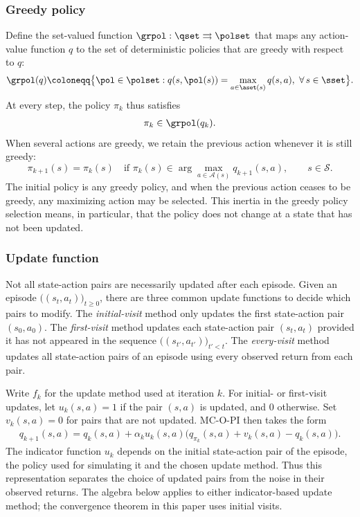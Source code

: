 \subsubsection{Greedy policy}

Define the set-valued function $\grpol : \qset \rightrightarrows \polset$ that maps any action-value function $q$ to the set of deterministic policies that are greedy with respect to $q$:
\begin{align}
\label{eq: greedy pol}
    \grpol(q) \coloneqq \big\{ \pol \in \polset : q(s, \pol(s)) = \max_{a \in \aset(s)} q(s,a), \ \forall \, s \in \sset \big\} .
\end{align}
At every step, the policy $\pi_k$ thus satisfies
\begin{align}
\label{eq: greedy policy def}
    \pi_k \in \grpol(q_k) .
\end{align}
When several actions are greedy, we retain the previous action whenever it is still greedy:
\begin{equation}
\label{eq:greedy-pol-tie-breaking}
\pi_{k+1}(s)=\pi_k(s)
\quad\text{if }\pi_k(s)\in\arg\max_{a\in\mathcal A(s)}q_{k+1}(s,a),
\qquad s\in\mathcal S.
\end{equation}
The initial policy is any greedy policy, and when the previous action ceases to be greedy, any maximizing action may be selected.
This inertia in the greedy policy selection means, in particular, that the policy does not change at a state that has not been updated.

\subsubsection{Update function}

Not all state-action pairs are necessarily updated after each episode.
Given an episode $\big( (s_t, a_t) \big)_{t \ge 0}$, there are three common update functions to decide which pairs to modify.
The \textit{initial-visit} method only updates the first state-action pair $(s_0, a_0)$.
The \textit{first-visit} method updates each state-action pair $(s_t, a_t)$ provided it has not appeared in the sequence $\big((s_{t'}, a_{t'})\big)_{t' < t}$.
The \textit{every-visit} method updates all state-action pairs of an episode using every observed return from each pair.

Write $f_k$ for the update method used at iteration $k$.
For initial- or first-visit updates, let $u_k(s,a)=1$ if the pair $(s,a)$ is updated, and $0$ otherwise. Set $v_k(s,a)=0$ for pairs that are not updated.
MC-O-PI then takes the form
\begin{align}
\label{eq: update q with chi}
q_{k+1}(s,a)
= q_k(s,a)+\alpha_k u_k(s,a)\big(q_{\pi_k}(s,a)+v_k(s,a)-q_k(s,a)\big).
\end{align}
The indicator function $u_k$ depends on the initial state-action pair of the episode, the policy used for simulating it and the chosen update method.
Thus this representation separates the choice of updated pairs from the noise in their observed returns. The algebra below applies to either indicator-based update method; the convergence theorem in this paper uses initial visits.


